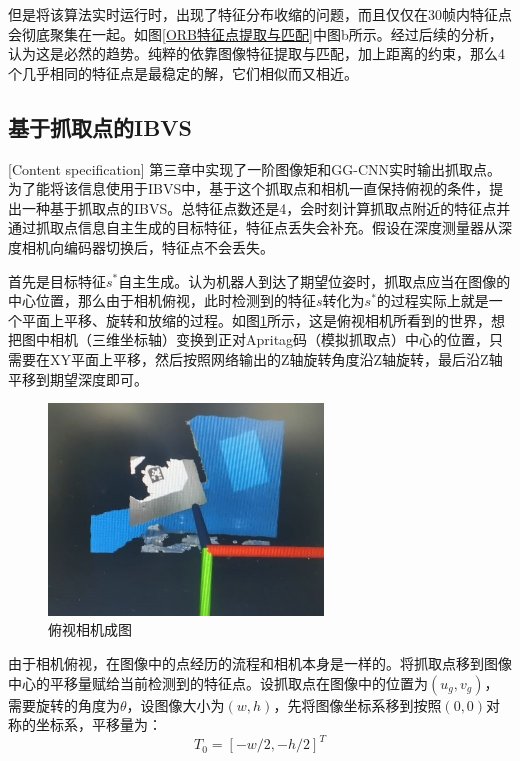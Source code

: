 \documentclass[fontset=fandol,type=bachelor,campus=harbin]{hithesisbook}
\begin{document}
但是将该算法实时运行时，出现了特征分布收缩的问题，而且仅仅在30帧内特征点会彻底聚集在一起。如图\ref{ORB特征点提取与匹配}中图b所示。经过后续的分析，认为这是必然的趋势。纯粹的依靠图像特征提取与匹配，加上距离的约束，那么4个几乎相同的特征点是最稳定的解，它们相似而又相近。
\subsection{基于抓取点的IBVS}[Content specification]
第三章中实现了一阶图像矩和GG-CNN实时输出抓取点。为了能将该信息使用于IBVS中，基于这个抓取点和相机一直保持俯视的条件，提出一种基于抓取点的IBVS。总特征点数还是4，会时刻计算抓取点附近的特征点并通过抓取点信息自主生成的目标特征，特征点丢失会补充。假设在深度测量器从深度相机向编码器切换后，特征点不会丢失。


首先是目标特征$s^*$自主生成。认为机器人到达了期望位姿时，抓取点应当在图像的中心位置，那么由于相机俯视，此时检测到的特征$s$转化为$s^*$的过程实际上就是一个平面上平移、旋转和放缩的过程。如图\ref{俯视相机成图}所示，这是俯视相机所看到的世界，想把图中相机（三维坐标轴）变换到正对Apritag码（模拟抓取点）中心的位置，只需要在XY平面上平移，然后按照网络输出的Z轴旋转角度沿Z轴旋转，最后沿Z轴平移到期望深度即可。
\begin{figure}[h]
\centering
\includegraphics[width = 0.65\textwidth]{chapter4/俯视相机成图}
\caption{俯视相机成图}
\label{俯视相机成图}
\end{figure}


由于相机俯视，在图像中的点经历的流程和相机本身是一样的。将抓取点移到图像中心的平移量赋给当前检测到的特征点。设抓取点在图像中的位置为$\left( u_g,v_g \right)$，需要旋转的角度为$\theta$，设图像大小为$\left( w,h \right)$，先将图像坐标系移到按照$\left( 0,0 \right)$对称的坐标系，平移量为：
\begin{equation}
T_0=\left[ -w/2,-h/2 \right] ^T
\label{目标特征转化平移量}
\end{equation}
\end{document}
